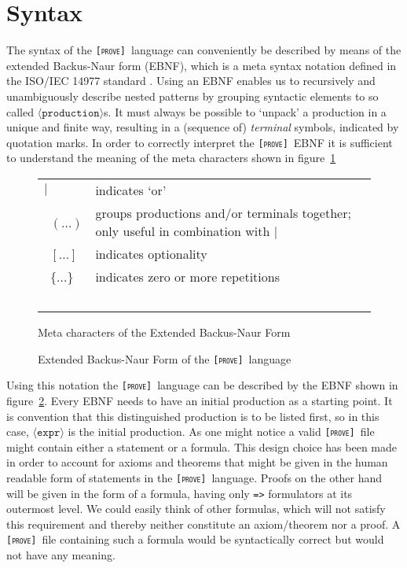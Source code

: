 \documentclass[british]{article}
\newcommand\prv{bc}
\newcommand\m[1]{\texttt{#1}}
\newcommand\name{\texttt{\textsc{[prove]}}}
\providecommand{\tabularnewline}{\\}
\begin{document}
\section{Syntax}

The syntax of the \name\ language can conveniently be described by means of the
extended Backus-Naur form (EBNF), which is a meta syntax notation defined in the
ISO/IEC 14977 standard \parencite{ISO}. Using an EBNF enables us to recursively
and unambiguously describe nested patterns by grouping syntactic elements to so
called $\langle\texttt{production}\rangle$s.  It must always be possible to
`unpack' a production in a unique and finite way, resulting in a (sequence of)
\textit{terminal} symbols, indicated by quotation marks. In order to correctly
interpret the \name\ EBNF it is sufficient to understand the meaning of the meta
characters shown in figure~\ref{fig:meta}

\bigskip{}

\begin{figure}[!ht]
\centering
\begin{doublespace}
\begin{tabular}{l|l}
$|$ & indicates `or'\tabularnewline\
$(\dots)$ & groups productions and/or terminals together; only useful in
combination with $|$\tabularnewline\
$[\dots]$ & indicates optionality\tabularnewline\
$\{\dots\}$ & indicates zero or more repetitions\tabularnewline\
\end{tabular}%
\caption{Meta characters of the Extended Backus-Naur Form}\label{fig:meta}
\end{doublespace}
\end{figure}

\begin{figure}[!ht]
\centering

\caption{Extended Backus-Naur Form of the \name\ language}\label{fig:ebnf}
\end{figure}

\medskip{}

Using this notation the \name\ language can be described by the EBNF shown in
figure~\ref{fig:ebnf}.  Every EBNF needs to have an initial production as a
starting point.  It is convention that this distinguished production is to be
listed first, so in this case, $\langle\texttt{expr}\rangle$ is the initial
production. As one might notice a valid \name\ file might contain either a
statement or a formula. This design choice has been made in order to account for
axioms and theorems that might be given in the human readable form of statements
in the \name\ language.  Proofs on the other hand will be given in the form of a
formula, having only \m{=>} formulators at its outermost level. We could easily
think of other formulas, which will not satisfy this requirement and thereby
neither constitute an axiom/theorem nor a proof. A \name\ file containing such a
formula would be syntactically correct but would not have any meaning.
\end{document}
